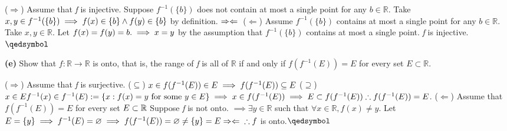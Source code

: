 \documentclass[12pt]{article}
\newcommand{\R}{\mathbb{R}}
\begin{document}
\begin{solution}\newline
($\Rightarrow$) Assume that \textit{f} is injective.
Suppose $f^{-1}(\{b\})$ does not contain at most a single point for any $b\in\R$.\newline
Take $x,y\in f^{-1}(\{b\})\newline
\implies f(x)\in \{b\} \land f(y)\in\{b\}$ by definition.\newline
$\Rightarrow\Leftarrow\newline$
($\Leftarrow$) Assume $f^{-1}(\{b\})$ contains at most a single point for any $b\in\R$.\newline
Take $x,y\in\R$. Let $f(x)=f(y)=b.\newline
\implies x=y$ by the assumption that $f^{-1}(\{b\})$ contains at most a single point.\newline
\textit{f} is injective.\flushright$\qedsymbol$
\end{solution}
\begin{subproblem}\textbf{(e)}
Show that $f:\R\to\R$ is onto, that is, the range of \textit{f} is all of $\R$ if and only if $f(f^{-1}(E))=E$ for every set $E\subset\R$.
\end{subproblem}

\begin{solution}\newline
($\Rightarrow$) Assume that \textit{f} is surjective.\newline
($\subseteq$) $x\in f(f^{-1}(E))\in E\newline
\implies f(f^{-1}(E))\subseteq E\newline$
($\supseteq$) $x\in E\newline
f^{-1}(x)\in f^{-1}(E):=\{x:f(x)=y\text{ for some } y\in E\}\newline
\implies x\in f(f^{-1}(E))\newline
\implies E\subset f(f^{-1}(E))\newline
\therefore f(f^{-1}(E))=E$.\newline
($\Leftarrow$) Assume that $f(f^{-1}(E))=E$ for every set $E\subset\R\newline$
Suppose \textit{f} is not onto.\newline
$\implies \exists y\in\R$ such that $\forall x\in \R, f(x)\neq y$.\newline
Let $E=\{y\}\newline
\implies f^{-1}(E)=\varnothing\newline
\implies f(f^{-1}(E))=\varnothing\neq\{y\}=E\newline
\Rightarrow\Leftarrow\newline
\therefore f$ is onto.\flushright$\qedsymbol$
\end{solution}
\end{document}
